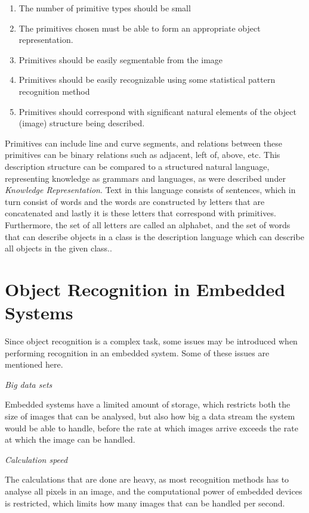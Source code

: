 \begin{enumerate}
\item The number of primitive types should be small
\item The primitives chosen must be able to form an appropriate object representation.
\item Primitives should be easily segmentable from the image
\item Primitives should be easily recognizable using some statistical pattern recognition method
\item Primitives should correspond with significant natural elements of the object (image) structure being described.
\end{enumerate}

Primitives can include line and curve segments, and relations between these primitives can be binary relations such as adjacent, left of, above, etc. This description structure can be compared to a structured natural language, representing knowledge as grammars and languages, as were described under \textit{Knowledge Representation}. Text in this language consists of sentences, which in turn consist of words and the words are constructed by letters that are concatenated and lastly it is these letters that correspond with primitives. Furthermore, the set of all letters are called an alphabet, and the set of words that can describe objects in a class is the description language which can describe all objects in the given class.\citep[Pages 410-418]{obj_recogn_book}.

\section{Object Recognition in Embedded Systems}
Since object recognition is a complex task, some issues may be introduced when performing recognition in an embedded system. Some of these issues are mentioned here. 

\emph{Big data sets}

Embedded systems have a limited amount of storage, which restricts both the size of images that can be analysed, but also how big a data stream the system would be able to handle, before the rate at which images arrive exceeds the rate at which the image can be handled.

\emph{Calculation speed}

The calculations that are done are heavy, as most recognition methods has to analyse all pixels in an image, and the computational power of embedded devices is restricted, which limits how many images that can be handled per second.

